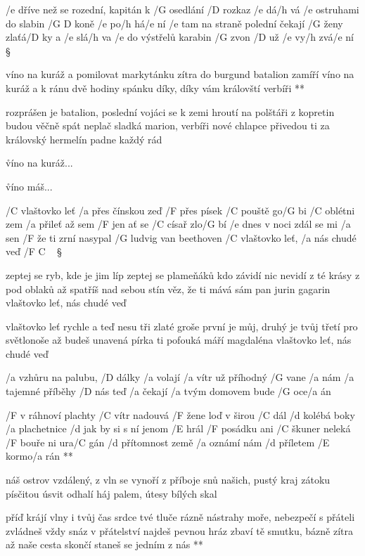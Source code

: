 /e dříve než se rozední, kapitán k /G osedlání /D rozkaz /e dá/h vá
/e ostruhami do slabin /{G D} koně /e po/h há/e ní
/e tam na straně polední čekají /G ženy zlaťá/D ky a /e slá/h va
/e do výstřelů karabin /G zvon /D už /e vy/h zvá/e ní \S

\R víno na kuráž a pomilovat markytánku
   zítra do burgund batalion zamíří
   víno na kuráž a k ránu dvě hodiny spánku
   díky, díky vám královští verbíři **

rozprášen je batalion, poslední vojáci se k zemi hroutí
na polštáři z kopretin budou věčně spát
neplač sladká marion, verbíři nové chlapce přivedou ti
za královský hermelín padne každý rád \s

\r víno na kuráž...

\r víno máš...




/C vlaštovko leť /a přes čínskou zeď
/F přes písek /C pouště go/G bi
/C oblétni zem /a přileť až sem
/F jen ať se /C císař zlo/G bí
/e dnes v noci zdál se mi /a sen
/F že ti zrní nasypal /G ludvig van beethoven
/C vlaštovko leť, /a nás chudé veď /{F C} {\ } \S

zeptej se ryb, kde je jim líp
zeptej se plameňáků
kdo závidí nic nevidí
z té krásy z pod oblaků
až spatříš nad sebou stín
věz, že ti mává sám pan jurin gagarin
vlaštovko leť, nás chudé veď \s

vlaštovko leť rychle a teď
nesu tři zlaté groše
první je můj, druhý je tvůj
třetí pro světlonoše
až budeš unavená
pírka ti pofouká máří magdaléna
vlaštovko leť, nás chudé veď \s




/a vzhůru na palubu, /D dálky /a volají
/a vítr už příhodný /G vane /a nám
/a tajemné příběhy /D nás teď /a čekají
/a tvým domovem bude /G oce/a án

\R  /F v ráhnoví plachty /C vítr nadouvá
    /F žene loď v širou /C dál
    /d kolébá boky /a plachetnice
    /d jak by si s ní jenom /E hrál
    /F posádku ani /C škuner neleká
    /F bouře ni ura/C gán
    /d přítomnost země /a oznámí nám
    /d příletem /E kormo/a rán **

náš ostrov vzdálený, z vln se vynoří
z příboje snů našich, pustý kraj
zátoku písčitou úsvit odhalí
háj palem, útesy bílých skal

\R  příď krájí vlny i tvůj čas
    srdce tvé tluče rázně
    nástrahy moře, nebezpečí
    s přáteli zvládneš vždy snáz
    v přátelství najdeš pevnou hráz
    zbaví tě smutku, bázně
    zítra až naše cesta skončí
    staneš se jedním z nás **



